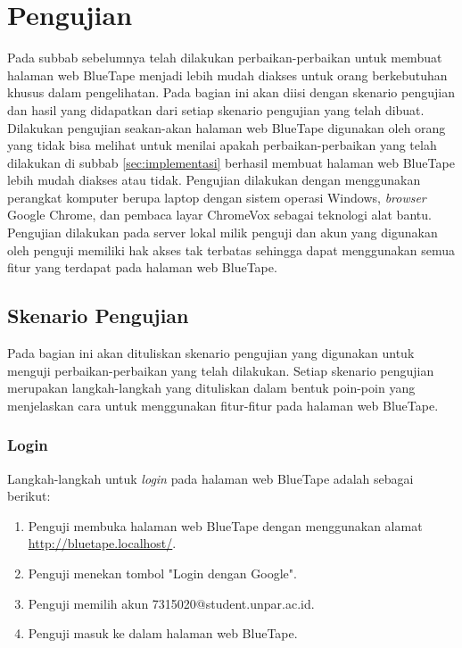 \section{Pengujian}
\label{sec:pengujian}
Pada subbab sebelumnya telah dilakukan perbaikan-perbaikan untuk membuat halaman web BlueTape menjadi lebih mudah diakses untuk orang berkebutuhan khusus dalam pengelihatan. Pada bagian ini akan diisi dengan skenario pengujian dan hasil yang didapatkan dari setiap skenario pengujian yang telah dibuat. Dilakukan pengujian seakan-akan halaman web BlueTape digunakan oleh orang yang tidak bisa melihat untuk menilai apakah perbaikan-perbaikan yang telah dilakukan di subbab \ref{sec:implementasi} berhasil membuat halaman web BlueTape lebih mudah diakses atau tidak. Pengujian dilakukan dengan menggunakan perangkat komputer berupa laptop dengan sistem operasi Windows, \textit{browser} Google Chrome, dan pembaca layar ChromeVox sebagai teknologi alat bantu. Pengujian dilakukan pada server lokal milik penguji dan akun yang digunakan oleh penguji memiliki hak akses tak terbatas sehingga dapat menggunakan semua fitur yang terdapat pada halaman web BlueTape.

\subsection{Skenario Pengujian}
\label{subsec:skenario_pengujian}
Pada bagian ini akan dituliskan skenario pengujian yang digunakan untuk menguji perbaikan-perbaikan yang telah dilakukan. Setiap skenario pengujian merupakan langkah-langkah yang dituliskan dalam bentuk poin-poin yang menjelaskan cara untuk menggunakan fitur-fitur pada halaman web BlueTape.

\subsubsection{Login}
\label{subsubsec:skenario_login}
Langkah-langkah untuk \textit{login} pada halaman web BlueTape adalah sebagai berikut:

\begin{enumerate}
    \item Penguji membuka halaman web BlueTape dengan menggunakan alamat \url{http://bluetape.localhost/}.
    \item Penguji menekan tombol "Login dengan Google".
    \item Penguji memilih akun 7315020@student.unpar.ac.id.
    \item Penguji masuk ke dalam halaman web BlueTape.
\end{enumerate}

